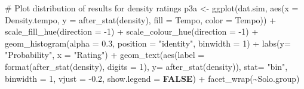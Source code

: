 \documentclass[
  bookmarksnumbered]{article}
\newenvironment{Shaded}{\begin{snugshade}}{\end{snugshade}}
\newcommand{\AttributeTok}[1]{\textcolor[rgb]{0.80,0.80,0.80}{#1}}
\newcommand{\CommentTok}[1]{\textcolor[rgb]{0.50,0.62,0.50}{#1}}
\newcommand{\ConstantTok}[1]{\textcolor[rgb]{0.86,0.64,0.64}{\textbf{#1}}}
\newcommand{\DecValTok}[1]{\textcolor[rgb]{0.86,0.86,0.80}{#1}}
\newcommand{\FloatTok}[1]{\textcolor[rgb]{0.75,0.75,0.82}{#1}}
\newcommand{\FunctionTok}[1]{\textcolor[rgb]{0.94,0.94,0.56}{#1}}
\newcommand{\NormalTok}[1]{\textcolor[rgb]{0.80,0.80,0.80}{#1}}
\newcommand{\OtherTok}[1]{\textcolor[rgb]{0.94,0.94,0.56}{#1}}
\newcommand{\SpecialCharTok}[1]{\textcolor[rgb]{0.86,0.64,0.64}{#1}}
\newcommand{\StringTok}[1]{\textcolor[rgb]{0.80,0.58,0.58}{#1}}
\begin{document}
\begin{Shaded}
\begin{Highlighting}[]
\CommentTok{\# Plot distribution of results for density ratings}
\NormalTok{p3a }\OtherTok{\textless{}{-}} \FunctionTok{ggplot}\NormalTok{(dat.sim, }\FunctionTok{aes}\NormalTok{(}\AttributeTok{x =}\NormalTok{ Density.tempo, }\AttributeTok{y =} \FunctionTok{after\_stat}\NormalTok{(density),}
                           \AttributeTok{fill =}\NormalTok{ Tempo, }\AttributeTok{color =}\NormalTok{ Tempo)) }\SpecialCharTok{+}
  \FunctionTok{scale\_fill\_hue}\NormalTok{(}\AttributeTok{direction =} \SpecialCharTok{{-}}\DecValTok{1}\NormalTok{) }\SpecialCharTok{+} \FunctionTok{scale\_colour\_hue}\NormalTok{(}\AttributeTok{direction =} \SpecialCharTok{{-}}\DecValTok{1}\NormalTok{) }\SpecialCharTok{+}
  \FunctionTok{geom\_histogram}\NormalTok{(}\AttributeTok{alpha =} \FloatTok{0.3}\NormalTok{, }\AttributeTok{position =} \StringTok{"identity"}\NormalTok{, }\AttributeTok{binwidth =} \DecValTok{1}\NormalTok{) }\SpecialCharTok{+}
  \FunctionTok{labs}\NormalTok{(}\AttributeTok{y=} \StringTok{"Probability"}\NormalTok{, }\AttributeTok{x =} \StringTok{"Rating"}\NormalTok{) }\SpecialCharTok{+}
  \FunctionTok{geom\_text}\NormalTok{(}\FunctionTok{aes}\NormalTok{(}\AttributeTok{label =} \FunctionTok{format}\NormalTok{(}\FunctionTok{after\_stat}\NormalTok{(density), }\AttributeTok{digits =} \DecValTok{1}\NormalTok{), }\AttributeTok{y=} \FunctionTok{after\_stat}\NormalTok{(density)), }
            \AttributeTok{stat=} \StringTok{"bin"}\NormalTok{, }\AttributeTok{binwidth =} \DecValTok{1}\NormalTok{, }
            \AttributeTok{vjust =} \SpecialCharTok{{-}}\FloatTok{0.2}\NormalTok{,}
            \AttributeTok{show.legend =} \ConstantTok{FALSE}\NormalTok{) }\SpecialCharTok{+}
  \FunctionTok{facet\_wrap}\NormalTok{(}\SpecialCharTok{\textasciitilde{}}\NormalTok{Solo.group)}


\end{Highlighting}
\end{Shaded}
\end{document}

